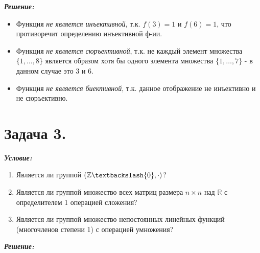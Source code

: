 \noindent\textbf{\textit{Решение:}}

\begin{itemize}
	\item Функция \textit{не является инъективной}, т.к. $f(3) = 1$ и $f(6) = 1$, что противоречит определению инъективной ф-ии.
	\item Функция \textit{не является сюръективной}, т.к. не каждый элемент множества $\{1, \dots, 8\}$ является образом хотя бы одного элемента множества $\{1, \dots, 7\}$ - в данном случае это 3 и 6.
	\item Функция \textit{не является биективной}, т.к. данное отображение не инъективно и не сюръективно.
\end{itemize}

\section*{Задача 3.}

\noindent\textbf{\textit{Условие:}}

\begin{enumerate}[label=\alph*)]
	\item Является ли группой $(\mathbb{Z} \textbackslash \{0\}, \cdot)$?
	\item Является ли группой множество всех матриц размера $n \times n$ над $\mathbb{R}$ с определителем 1 операцией сложения?
	\item Является ли группой множество непостоянных линейных функций (многочленов степени 1) с операцией умножения?
\end{enumerate}

\noindent\textbf{\textit{Решение:}}

\begin{center}
	\qquad
\end{center}

